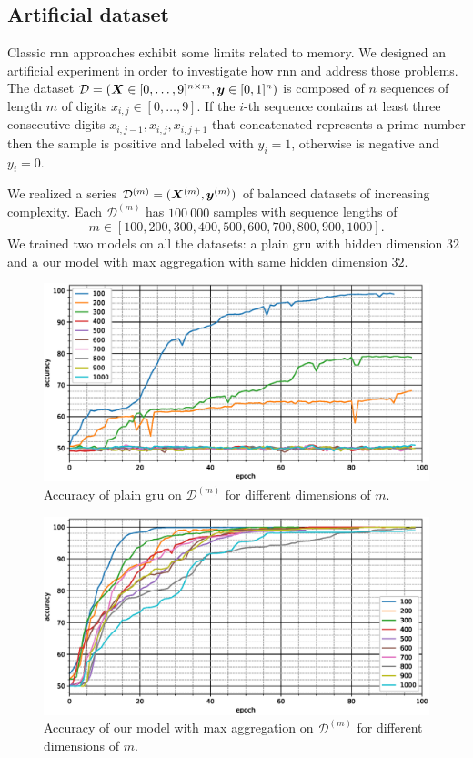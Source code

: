 \subsection{Artificial dataset}\label{sec:experiments}
Classic \ac{rnn} approaches exhibit some limits related to
memory. We designed an artificial experiment in
order to investigate how \ac{rnn} and \maxp{} address those
problems. The dataset 
$\mathcal{D}=(\bm{X}\in [0,\dots,9]^{n\times m},\bm{y}\in [0,1]^n)$ is
composed of $n$ sequences of length
$m$ of digits $x_{i,j}\in[0,\dots,9]$. If the $i$-th sequence contains
at least three consecutive digits
$x_{i,j-1},x_{i,j},x_{i,j+1}$ that concatenated represents a prime
number then the
sample is positive and labeled with $y_i=1$, otherwise is negative and
$y_i=0$.

We realized a series
$\mathcal{D}^{(m)}=(\bm{X}^{(m)},\bm{y}^{(m)})$ of balanced
datasets of increasing complexity. Each $\mathcal{D}^{(m)}$ has $100\ 000$
samples with 
sequence lengths of
$$
m\in[100,200,300,400,500,600,700,800,900,1000].$$
We trained two models on
all the datasets: a plain \ac{gru} with hidden dimension $32$ and a
our model with max aggregation with same hidden dimension $32$. 

\begin{figure}
  \centering
  \includegraphics[width=\floatwidth]{imgMax/accuracy-base.eps}
  \caption{Accuracy of plain \ac{gru} on $\mathcal{D}^{(m)}$ for different dimensions of $m$.}
  \label{fig:testAccBase}
\end{figure}

\begin{figure}
  \centering
  \includegraphics[width=\floatwidth]{imgMax/accuracy-max.eps}
  \caption{Accuracy of our model with max aggregation on $\mathcal{D}^{(m)}$ for different dimensions of $m$.}
  \label{fig:testAccMax}
\end{figure}

